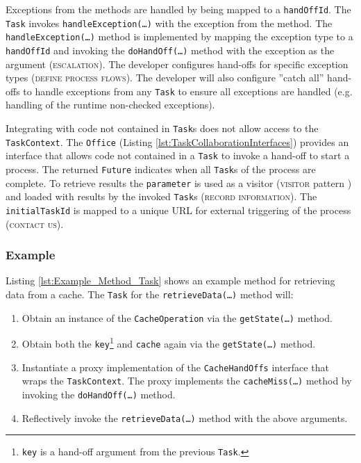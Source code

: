 \documentclass[prodmode]{style/acmlarge}
\begin{document}
Exceptions from the methods are handled by being mapped to a \texttt{handOffId}.
The \texttt{Task} invokes \texttt{handle\-Excep\-tion(\ldots)} with the
exception from the method.  The \texttt{handleException(\ldots)} method is
implemented by mapping the exception type to a \texttt{handOffId} and invoking
the \texttt{doHandOff(\ldots)} method with the exception as the argument
(\textsc{escalation}).  The developer configures hand-offs for specific
exception types (\textsc{define process flows}).  The developer will also
configure ''catch all'' hand-offs to handle exceptions from any \texttt{Task} to
ensure all exceptions are handled (e.g. handling of the runtime non-checked
exceptions).

Integrating with code not contained in \texttt{Task}s does not allow access to
the \texttt{TaskContext}.  The \texttt{Office} (Listing
\ref{lst:TaskCollaborationInterfaces}) provides an interface that allows code
not contained in a \texttt{Task} to invoke a hand-off to start a process.  The
returned \texttt{Future} indicates when all \texttt{Task}s of the process are
complete.  To retrieve results the \texttt{parameter} is used as a visitor
(\textsc{visitor} pattern \cite{gof}) and loaded with results by the invoked
\texttt{Task}s (\textsc{record information}).  The \texttt{initialTaskId} is
mapped to a unique URL for external triggering of the process (\textsc{contact
us}).



\subsubsection*{Example}

Listing \ref{lst:Example_Method_Task} shows an example method for retrieving
data from a cache.  The \texttt{Task} for the \texttt{retrieve\-Data(\ldots)}
method will:
\begin{enumerate}
  \item Obtain an instance of the \texttt{CacheOperation} via the \texttt{getState(\ldots)} method.
  \item Obtain both the \texttt{key}\footnote{\texttt{key} is a hand-off argument from the previous \texttt{Task}.} and \texttt{cache} again via the \texttt{getState(\ldots)} method.
  \item Instantiate a proxy implementation of the \texttt{CacheHandOffs} interface that wraps the \texttt{TaskContext}.  The proxy implements the \texttt{cacheMiss(\ldots)} method by invoking the \texttt{doHandOff(\ldots)} method. 
  \item Reflectively invoke the \texttt{retrieveData(\ldots)} method with the above arguments.
\end{enumerate}
\end{document}

